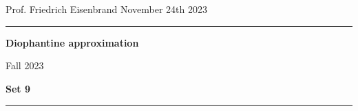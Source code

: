 \documentclass[12pt,a4paper]{article}
\date{}
\theoremstyle{plain}
\newtheorem*{Sol*}{Solution}
\theoremstyle{definition}
\newtheorem{Ex}{Exercise}
\newif\ifsolutions
\newcommand{\exercise}[2]{
			\begin{Ex} #1 \end{Ex}
			\ifsolutions  \begin{Sol*} #2 \end{Sol*} \bigskip \else \bigskip  \fi
		}
\begin{document}
\begin{center}
{Prof. Friedrich Eisenbrand \hfill November 24th 2023}
\end{center}
	
\hrule\vspace{\baselineskip}

\begin{center}
\textbf{Diophantine approximation}

Fall 2023

\bigskip

\textbf{Set 9}
\ifsolutions{\textbf{- Solutions}} \else{} \fi
\end{center}

\hrule\vspace{\baselineskip}



\end{document}
